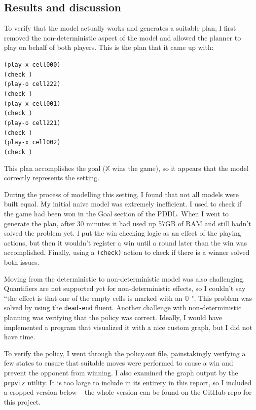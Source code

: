 \documentclass[11pt]{article}
\newcommand{\XX}{$\mathbb{X}$ }
\newcommand{\OO}{$\mathbb{O}$ }
\begin{document}
\subsection{Results and discussion}
To verify that the model actually works and generates a suitable plan, I first removed the non-deterministic aspect of the model and allowed the planner to play on behalf of both players. This is the plan that it came up with:
\begin{displayquote}
\texttt{(play-x cell000)\\
(check )\\
(play-o cell222)\\
(check )\\
(play-x cell001)\\
(check )\\
(play-o cell221)\\
(check )\\
(play-x cell002)\\
(check )}
\end{displayquote}

This plan accomplishes the goal (\XX wins the game), so it appears that the model correctly represents the setting.

During the process of modelling this setting, I found that not all models were built equal. My initial naive model was extremely inefficient. I used to check if the game had been won in the Goal section of the PDDL. When I went to generate the plan, after 30 minutes it had used up 57GB of RAM and still hadn't solved the problem yet. I put the win checking logic as an effect of the playing actions, but then it wouldn't register a win until a round later than the win was accomplished. Finally, using a \texttt{(check)} action to check if there is a winner solved both issues.

Moving from the deterministic to non-deterministic model was also challenging. Quantifiers are not supported yet for non-deterministic effects, so I couldn't say ``the effect is that one of the empty cells is marked with an \OO". This problem was solved by using the \texttt{dead-end} fluent. Another challenge with non-deterministic planning was verifying that the policy was correct. Ideally, I would have implemented a program that visualized it with a nice custom graph, but I did not have time.

To verify the policy, I went through the policy.out file, painstakingly verifying a few states to ensure that suitable moves were performed to cause a win and prevent the opponent from winning. I also examined the graph output by the \texttt{prpviz} utility. It is too large to include in its entirety in this report, so I included a cropped version below -- the whole version can be found on the GitHub repo for this project.
\end{document}
